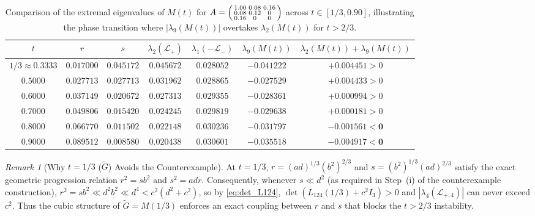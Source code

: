 \documentclass[11pt,a4paper]{article}
\theoremstyle{plain}
\theoremstyle{definition}
\theoremstyle{remark}
\newtheorem{remark}[theorem]{Remark}
\begin{document}
\begin{table}[htbp]
\centering
\caption{Comparison of the extremal eigenvalues of $M(t)$ for $A = \begin{psmallmatrix} 1.00 & 0.08 & 0.16 \\ 0.08 & 0.12 & 0 \\ 0.16 & 0 & 0 \end{psmallmatrix}$ across $t \in [1/3, 0.90]$, illustrating the phase transition where $|\lambda_9(M(t))|$ overtakes $\lambda_2(M(t))$ for $t > 2/3$.}
\label{tab:transition}
\medskip
\small
\begin{tabular}{@{}ccccccc@{}}
\toprule
$t$ & $r$ & $s$ & $\lambda_2(\mathcal{L}_+)$ & $\lambda_1(-\mathcal{L}_-)$ & $\lambda_9(M(t))$ & $\lambda_2(M(t)) + \lambda_9(M(t))$ \\
\midrule
$1/3 \approx 0.3333$ & $0.017000$ & $0.045172$ & $0.045672$ & $0.028052$ & $-0.041222$ & $+0.004451 > 0$ \\
$0.5000$ & $0.027713$ & $0.027713$ & $0.031962$ & $0.028865$ & $-0.027529$ & $+0.004433 > 0$ \\
$0.6000$ & $0.037149$ & $0.020672$ & $0.027313$ & $0.029355$ & $-0.028361$ & $+0.000994 > 0$ \\
$0.7000$ & $0.049806$ & $0.015420$ & $0.024245$ & $0.029819$ & $-0.029638$ & $+0.000181 > 0$ \\
$\mathbf{0.8000}$ & $\mathbf{0.066770}$ & $\mathbf{0.011502}$ & $\mathbf{0.022148}$ & $\mathbf{0.030236}$ & $\mathbf{-0.031797}$ & $\mathbf{-0.001561 < 0}$ \\
$\mathbf{0.9000}$ & $\mathbf{0.089512}$ & $\mathbf{0.008580}$ & $\mathbf{0.020438}$ & $\mathbf{0.030601}$ & $\mathbf{-0.035518}$ & $\mathbf{-0.004917 < 0}$ \\
\bottomrule
\end{tabular}
\end{table}

\begin{remark}[Why $t = 1/3$ ($\widetilde{G}$) Avoids the Counterexample]
At $t = 1/3$, $r = (ad)^{1/3}(b^2)^{2/3}$ and $s = (b^2)^{1/3}(ad)^{2/3}$ satisfy the exact geometric progression relation $r^2 = s b^2$ and $s^2 = a d r$. Consequently, whenever $s \ll d^2$ (as required in Step~(i) of the counterexample construction), $r^2 = s b^2 \ll d^2 b^2 \ll d^4 < c^2(d^2 + c^2)$, so by \eqref{eq:det_L124}, $\det(L_{124}(1/3) + c^2 I_3) > 0$ and $|\lambda_4(\mathcal{L}_{+,4})|$ can never exceed $c^2$. Thus the cubic structure of $\widetilde{G} = M(1/3)$ enforces an exact coupling between $r$ and $s$ that blocks the $t > 2/3$ instability.
\end{remark}
\end{document}
